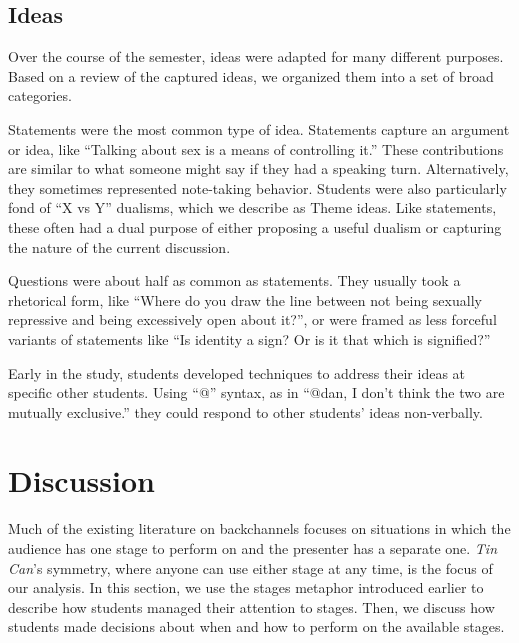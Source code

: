 

\subsection{Ideas}

Over the course of the semester, ideas were adapted for many different purposes. Based on a review of the captured ideas, we organized them into a set of broad categories.

Statements were the most common type of idea. Statements capture an argument or idea, like ``Talking about sex is a means of controlling it.'' These contributions are similar to what someone might say if they had a speaking turn. Alternatively, they sometimes represented note-taking behavior. Students were also particularly fond of ``X vs Y'' dualisms, which we describe as Theme ideas. Like statements, these often had a dual purpose of either proposing a useful dualism or capturing the nature of the current discussion. 

Questions were about half as common as statements. They usually took a rhetorical form, like ``Where do you draw the line between not being sexually repressive and being excessively open about it?'', or were framed as less forceful variants of statements like ``Is identity a sign? Or is it that which is signified?''

Early in the study, students developed techniques to address their ideas at specific other students. Using ``@'' syntax, as in ``@dan, I don't think the two are mutually exclusive.'' they could respond to other students' ideas non-verbally.


\section{Discussion}
Much of the existing literature on backchannels focuses on situations in which the audience has one stage to perform on and the presenter has a separate one.  \citep{Yardi:2006uk, mccarthy_digital_2004} \emph{Tin Can}'s symmetry, where anyone can use either stage at any time, is the focus of our analysis. In this section, we use the stages metaphor introduced earlier to describe how students managed their attention to stages. Then, we discuss how students made decisions about when and how to perform on the available stages. 

